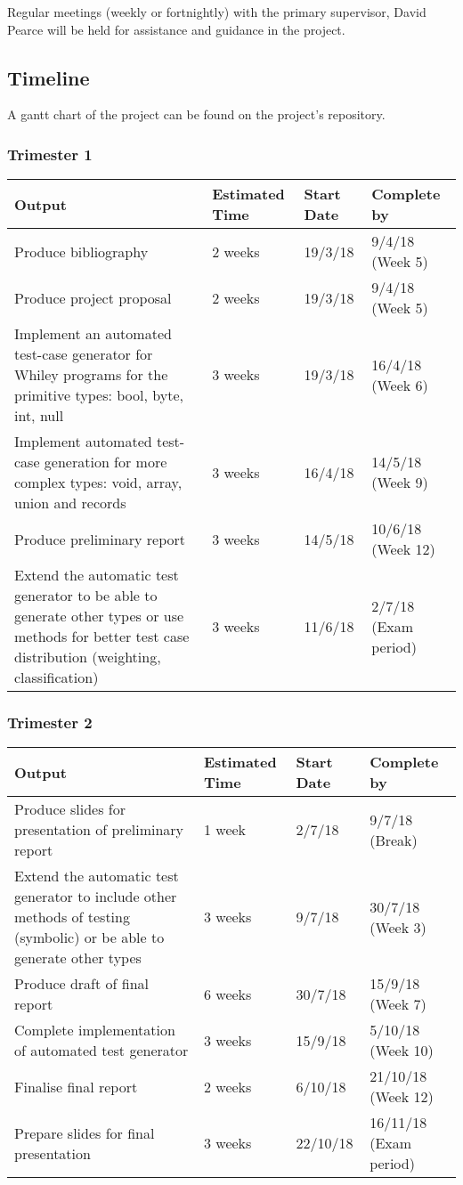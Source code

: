 \documentclass[11pt, a4paper, twoside, openright]{report}
\begin{document}
Regular meetings (weekly or fortnightly) with the primary supervisor, David Pearce will be held for assistance and guidance in the project.

\subsection*{Timeline}
A gantt chart of the project can be found on the project's repository.
\subsubsection*{Trimester 1}
\begin{tabular}{ |p{10cm}|p{2cm}|p{2cm}|p{2cm}| }
	\hline
	\textbf{Output} & \textbf{Estimated Time} &
	\textbf{Start Date} & \textbf{Complete by}\\
	\hline
	Produce bibliography & 2 weeks & 19/3/18
	& 9/4/18 (Week 5) \\
	\hline
	Produce project proposal & 2 weeks & 19/3/18 & 9/4/18 (Week 5) \\
	\hline
	Implement an automated test-case generator for Whiley programs for the primitive types: bool, byte, int, null & 3 weeks & 19/3/18 & 16/4/18 (Week 6) \\
	
	\hline
	Implement automated test-case generation for more complex types: void, array, union and records & 3 weeks & 16/4/18 & 14/5/18 (Week 9) \\
	\hline
	Produce preliminary report & 3 weeks & 14/5/18 & 10/6/18 (Week 12) \\	
	\hline
	Extend the automatic test generator to be able to generate other types or use methods for better test case distribution (weighting, classification) & 3 weeks & 11/6/18 & 2/7/18 (Exam period) \\
	\hline
\end{tabular}

\subsubsection*{Trimester 2}
\begin{tabular}{ |p{10cm}|p{2cm}|p{2cm}|p{2cm}| }
	\hline
	\textbf{Output} & \textbf{Estimated Time} & \textbf{Start Date} & \textbf{Complete by}\\
	\hline
	Produce slides for presentation of preliminary report & 1 week & 2/7/18 & 9/7/18 (Break)\\
	\hline
	Extend the automatic test generator to include other methods of testing (symbolic) or be able to generate other types & 3 weeks & 9/7/18 & 30/7/18 (Week 3)\\
	\hline
	Produce draft of final report & 6 weeks & 30/7/18 & 15/9/18 (Week 7)\\
	\hline
	Complete implementation of automated test generator & 3 weeks & 15/9/18 & 5/10/18 (Week 10) \\
	\hline
	Finalise final report & 2 weeks & 6/10/18 & 21/10/18 (Week 12) \\
	\hline
	Prepare slides for final presentation & 3 weeks & 22/10/18 & 16/11/18 (Exam period)\\
	\hline
\end{tabular}
\end{document}

